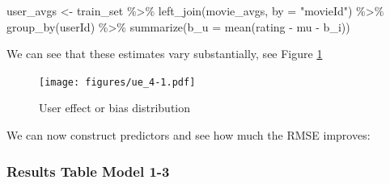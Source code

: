 \documentclass[
]{article}
\newenvironment{Shaded}{}{}
\newcommand{\AttributeTok}[1]{\textcolor[rgb]{0.49,0.56,0.16}{#1}}
\newcommand{\DecValTok}[1]{\textcolor[rgb]{0.25,0.63,0.44}{#1}}
\newcommand{\FloatTok}[1]{\textcolor[rgb]{0.25,0.63,0.44}{#1}}
\newcommand{\FunctionTok}[1]{\textcolor[rgb]{0.02,0.16,0.49}{#1}}
\newcommand{\NormalTok}[1]{#1}
\newcommand{\OtherTok}[1]{\textcolor[rgb]{0.00,0.44,0.13}{#1}}
\newcommand{\SpecialCharTok}[1]{\textcolor[rgb]{0.25,0.44,0.63}{#1}}
\newcommand{\StringTok}[1]{\textcolor[rgb]{0.25,0.44,0.63}{#1}}
\begin{document}
\newpage

\begin{Shaded}
\begin{Highlighting}[]
\NormalTok{user\_avgs }\OtherTok{\textless{}{-}}\NormalTok{ train\_set }\SpecialCharTok{\%\textgreater{}\%} \FunctionTok{left\_join}\NormalTok{(movie\_avgs, }\AttributeTok{by =} \StringTok{"movieId"}\NormalTok{) }\SpecialCharTok{\%\textgreater{}\%} 
    \FunctionTok{group\_by}\NormalTok{(userId) }\SpecialCharTok{\%\textgreater{}\%} \FunctionTok{summarize}\NormalTok{(}\AttributeTok{b\_u =} \FunctionTok{mean}\NormalTok{(rating }\SpecialCharTok{{-}}\NormalTok{ mu }\SpecialCharTok{{-}}\NormalTok{ b\_i))}
\end{Highlighting}
\end{Shaded}

We can see that these estimates vary substantially, see Figure
\ref{fig:model_3}

\begin{figure}
\centering
\texttt{[image: figures/ue\_4-1.pdf]}
\caption{User effect or bias distribution\label{fig:model_3}}
\end{figure}

We can now construct predictors and see how much the RMSE improves:

\begin{Shaded}
\end{Shaded}

\newpage

\hypertarget{results-table-model-1-3}{%
\subsubsection{Results Table Model 1-3}\label{results-table-model-1-3}}
\end{document}
